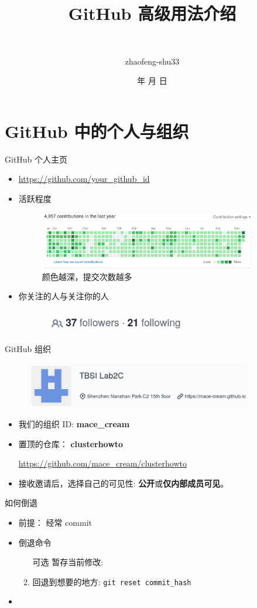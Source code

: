 \documentclass[notheorems,xetex]{beamer}
\title{GitHub 高级用法介绍} %
\author[赵丰]
{\quad {赵丰}\\ \and {zhaofeng-shu33}}
\institute[清华大学] %
{\normalsize\quad
  Lab2c 服务器使用培训
}
\date{\the\year 年 \the\month 月 \the\day 日}
\theoremstyle{definition}
\begin{document}
\frame{\titlepage}
\date{\hspace{1mm} \timemark}


\section{GitHub 中的个人与组织}
\begin{frame}{GitHub 个人主页}
\begin{itemize}
	\item \url{https://github.com/your_github_id}
	\item 活跃程度
     \begin{figure}
	\includegraphics[height=2.5cm]{activity.png}
	\caption*{颜色越深，提交次数越多}
	\end{figure}
	\item 你关注的人与关注你的人
	\begin{figure}
	\includegraphics[height=1cm]{ff.png}	
	\end{figure}
\end{itemize}
\end{frame}
\begin{frame}{GitHub 组织}
     \begin{figure}
	    \centering
		\includegraphics[height=2cm]{org.png}
	\end{figure}
\begin{itemize}
	\item 我们的组织 ID: \textbf{mace\_cream}
	\item 置顶的仓库： \textbf{clusterhowto}
	
	\url{https://github.com/mace_cream/clusterhowto}
	\item 接收邀请后，选择自己的可见性: \textbf{公开}或\textbf{仅内部成员可见}。
\end{itemize}
\end{frame}
\begin{frame}[noframenumbering]{如何倒退}
\begin{itemize}
	\item 前提： 经常 commit
	\item 倒退命令
	\begin{enumerate}
		\item [可选]暂存当前修改: 
		\item 回退到想要的地方: \texttt{git reset commit\_hash}
	\end{enumerate}
	\item 
\end{itemize}
\end{frame}
\end{document}
